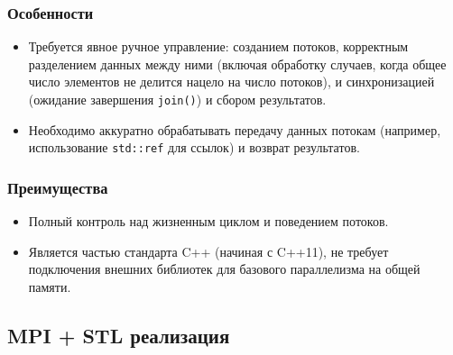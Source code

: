 \documentclass[12pt]{article}
\begin{document}
\subsubsection*{Особенности}
\begin{itemize}
  \item Требуется явное ручное управление: созданием потоков, корректным разделением данных между ними (включая обработку случаев, когда общее число элементов не делится нацело на число потоков), и синхронизацией (ожидание завершения \texttt{join()}) и сбором результатов.
  \item Необходимо аккуратно обрабатывать передачу данных потокам (например, использование \texttt{std::ref} для ссылок) и возврат результатов.
\end{itemize}

\subsubsection*{Преимущества}
\begin{itemize}
  \item Полный контроль над жизненным циклом и поведением потоков.
  \item Является частью стандарта C++ (начиная с C++11), не требует подключения внешних библиотек для базового параллелизма на общей памяти.
\end{itemize}

\subsection{MPI + STL реализация}
\end{document}
